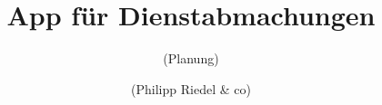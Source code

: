 

\newcommand{\trtitle}{App f\"ur Dienstabmachungen}
\newcommand{\scrartclScrreprt}{scrartcl}


\title{\trtitle}
\subtitle{(Planung)}
\author{(Philipp Riedel \& co)}

 
 



\maketitle


\tableofcontents
\thispagestyle{empty}
\newpage
{}










